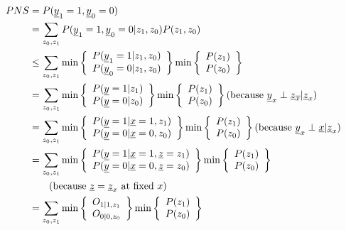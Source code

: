 \begin{align}
PNS&= P({\underline{y}}_1=1, {\underline{y}}_0=0)
\\
&=
\sum_{z_0,z_1}
P({\underline{y}}_1=1, {\underline{y}}_{0}=0|z_1, z_0)P(z_1, z_0)
\\
&\leq
\sum_{z_0,z_1}
\min\left\{\begin{array}{l}
P({\underline{y}}_1=1|z_1, z_0)\\
P({\underline{y}}_{0}=0|z_1, z_0)
\end{array}
\right\}
\min\left\{\begin{array}{l}
P(z_1)
\\
P(z_0)
\end{array}
\right\}
\\
&=
\sum_{z_0,z_1}
\min\left\{\begin{array}{l}
P({\underline{y}}=1|z_1)\\
P({\underline{y}}=0|z_0)
\end{array}
\right\}
\min\left\{\begin{array}{l}
P(z_1)
\\
P(z_0)
\end{array}
\right\}
\text{(because
 ${\underline{y}}_x\perp{\underline{z}}_{\overline{x}}|{\underline{z}}_x$)}
\\
&=
\sum_{z_0,z_1}
\min\left\{\begin{array}{l}
P({\underline{y}}=1|{\underline{x}}=1,z_1)\\
P({\underline{y}}=0|{\underline{x}}=0,z_0)
\end{array}
\right\}
\min\left\{\begin{array}{l}
P(z_1)
\\
P(z_0)
\end{array}
\right\}
\text{(because ${\underline{y}}_x\perp{\underline{x}}|{\underline{z}}_x$)}
\\
&=
\sum_{z_0,z_1}
\min\left\{\begin{array}{l}
P({\underline{y}}=1|{\underline{x}}=1, {\underline{z}}=z_1)\\
P({\underline{y}}=0|{\underline{x}}=0, {\underline{z}}=z_0)
\end{array}
\right\}
\min\left\{\begin{array}{l}
P(z_1)
\\
P(z_0)
\end{array}
\right\}
\\
&\quad\quad \nonumber
\text{(because ${\underline{z}}={\underline{z}}_x$ at fixed $x$)}
\\
&=
\sum_{z_0,z_1}
\min\left\{\begin{array}{l}
O_{1|1,z_1}\\
O_{0|0,z_0}
\end{array}
\right\}
\min\left\{\begin{array}{l}
P(z_1)
\\
P(z_0)
\end{array}
\right\}
\end{align}

